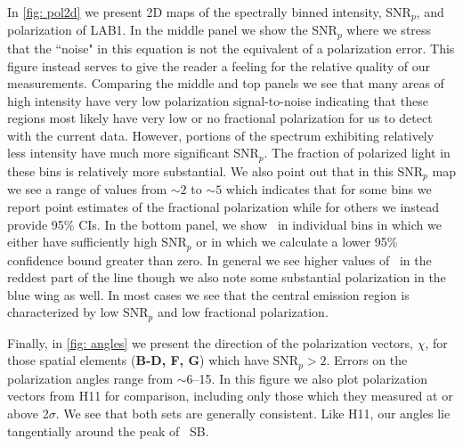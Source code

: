 In \autoref{fig: pol2d} we present 2D maps of the spectrally binned intensity, SNR$_p$, and polarization of LAB1. In the middle panel we show the SNR$_p$ where we stress that the ``noise" in this equation is not the equivalent of a polarization error. This figure instead serves to give the reader a feeling for the relative quality of our measurements. Comparing the middle and top panels we see that many areas of high intensity have very low polarization signal-to-noise indicating that these regions most likely have very low or no fractional polarization for us to detect with the current data. However, portions of the spectrum exhibiting relatively less intensity have much more significant SNR$_p$. The fraction of polarized light in these bins is relatively more substantial. We also point out that in this SNR$_p$ map we see a range of values from $\sim2$ to $\sim5$ which indicates that for some bins we report point estimates of the fractional polarization while for others we instead provide 95\% CIs. In the bottom panel, we show \pol~in individual bins in which we either have sufficiently high SNR$_p$ or in which we calculate a lower 95\% confidence bound greater than zero.  In general we see higher values of \pol~in the reddest part of the line though we also note some substantial polarization in the blue wing as well. In most cases we see that the central emission region is characterized by low SNR$_p$ and low fractional polarization.

Finally, in \autoref{fig: angles} we present the direction of the polarization vectors, $\chi$, for those spatial elements (\textbf{B-D, F, G}) which have SNR$_p > 2$.   Errors on the polarization angles range from $\sim$6--15\degs.  In this figure we also plot polarization vectors from H11 for comparison, including only those which they measured at or above 2$\sigma$. We see that both sets are generally consistent. Like H11, our angles lie tangentially around the peak of \lya~SB. 


